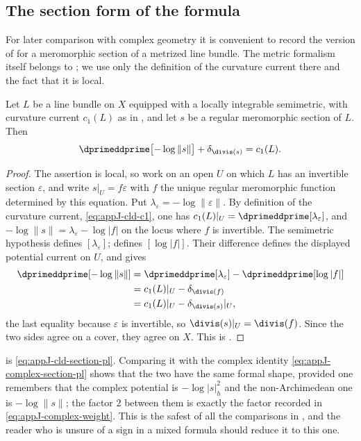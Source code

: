 \subsection{The section form of the formula}
\label{sec:ch15-pl-section}

For later comparison with complex geometry it is convenient to record the
version of  for a meromorphic section of a
metrized line bundle.  The metric formalism itself belongs to
; we use only the definition of the curvature
current there and the fact that it is local.

\begin{corollary}
\label{cor:ch15-pl-section}
Let $L$ be a line bundle on $X$ equipped with a locally integrable
semimetric, with curvature current $c_1(L)$ as in
, and let $s$ be a regular meromorphic
section of $L$.  Then
\[
 \dprimeddprime\bigl[-\log\|s\|\bigr]+\delta_{\divis(s)}=c_1(L).
\]
\end{corollary}

\begin{proof}
The assertion is local, so work on an open $U$ on which $L$ has an invertible
section $\varepsilon$, and write $s|_U=f\varepsilon$ with $f$ the unique
regular meromorphic function determined by this equation.  Put
$\lambda_\varepsilon=-\log\|\varepsilon\|$.  By definition of the curvature
current, \eqref{eq:appJ-cld-c1}, one has
$c_1(L)|_U=\dprimeddprime[\lambda_\varepsilon]$, and
$-\log\|s\|=\lambda_\varepsilon-\log|f|$ on the locus where $f$ is
invertible. The semimetric hypothesis defines $[\lambda_\varepsilon]$;
 defines $[\log|f|]$. Their difference defines
the displayed potential current on $U$, and
 gives
\[
 \begin{aligned}
  \dprimeddprime[-\log\|s\|]
   &=\dprimeddprime[\lambda_\varepsilon]-\dprimeddprime[\log|f|]\\
   &=c_1(L)|_U-\delta_{\divis(f)}\\
   &=c_1(L)|_U-\delta_{\divis(s)}|_U,
 \end{aligned}
\]
the last equality because $\varepsilon$ is invertible, so
$\divis(s)|_U=\divis(f)$.  Since the two sides agree on a cover, they agree
on $X$.  This is \cite[Theorem~18.1.6]{CLD25}.
\end{proof}

 is \eqref{eq:appJ-cld-section-pl}.  Comparing it
with the complex identity \eqref{eq:appJ-complex-section-pl} shows that the
two have the same formal shape, provided one remembers that the complex
potential is $-\log|s|_h^2$ and the non-Archimedean one is $-\log\|s\|$; the
factor $2$ between them is exactly the factor recorded in
\eqref{eq:appJ-complex-weight}.  This is the safest of all the comparisons in
, and the reader who is unsure of a sign in a
mixed formula should reduce it to this one.

